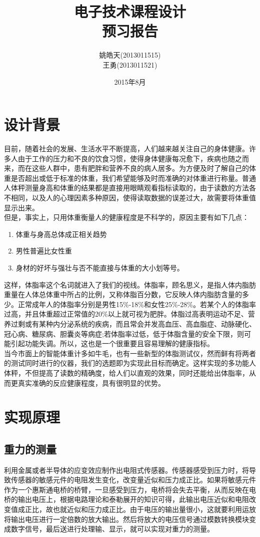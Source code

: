\documentclass[16pt,a4paper]{article}
\author{姚皓天(2013011515) \\ 王勇(2013011521)}
\title{电子技术课程设计 \\ 预习报告}
\date{2015年8月}
\begin{document}
\maketitle
\newpage

\thispagestyle{empty}
\renewcommand\contentsname{\textbf{目录}}
\tableofcontents
\newpage

\section{设计背景}
目前，随着社会的发展、生活水平不断提高，人们越来越关注自己的身体健康。许多人由于工作的压力和不良的饮食习惯，使得身体健康每况愈下，疾病也随之而来，而在这些人群中，患有肥胖和营养不良的病人居多。为方便及时了解自己的体重是否超出或低于标准的体重，我们希望能够及时而准确的对体重进行称量。普通人体秤测量身高和体重的结果都是直接用眼睛观看指标读取的，由于读数的方法各不相同，以及人的心理因素多种原因，使得读取数据的误差过大，故需要将体重值显示出来。\\
但是，事实上，只用体重衡量人的健康程度是不科学的，原因主要有如下几点：
\begin{enumerate}
\item 体重与身高总体成正相关趋势
\item 男性普遍比女性重
\item 身材的好坏与强壮与否不能直接与体重的大小划等号。
\end{enumerate}
这样，体脂率这个名词就进入了我们的视线。体脂率，顾名思义，是指人体内脂肪重量在人体总体重中所占的比例，又称体脂百分数，它反映人体内脂肪含量的多少。正常成年人的体脂率分别是男性15\%-18\%和女性25\%-28\%。若某个人的体脂率过高，并且体重超过正常值的20\%以上就可视为肥胖。体脂过高表明运动不足、营养过剩或有某种内分泌系统的疾病，而且常会并发高血压、高血脂症、动脉硬化、冠心病、糖尿病、胆囊炎等病症;若体脂率过低，低于体脂含量的安全下限，则可能引起功能失调。所以，这也是一个很重要且容易理解的健康指标。\\
当今市面上的智能体重计多如牛毛，也有一些新型的体脂测试仪，然而鲜有将两者的测试同时进行的仪器，我们的选题即为实现此目标而确定。这样实现的多功能人体秤，不但提高了读数的精确度，给人们以直观的效果，同时还能给出体脂率，从而更真实准确的反应健康程度，具有很明显的优势。

\section{实现原理}
\subsection{重力的测量}
利用金属或者半导体的应变效应制作出电阻式传感器。传感器感受到压力时，将导致传感器的敏感元件的电阻发生变化，改变量近似和压力成正比。如果将敏感元件作为一个惠斯通电桥的桥臂，一旦感受到压力，电桥将会失去平衡，从而反映在电桥的输出电压上，根据电路理论和泰勒展开的知识可得，此输出电压近似和电阻改变值成正比，故也就近似和压力成正比。由于电压的输出量很小，这就要利用运放将输出电压进行一定倍数的放大输出。然后将放大的电压信号通过模数转换模块变成数字信号，最后送进行处理输、显示，就可以实现对重力的测量。
\end{document}
